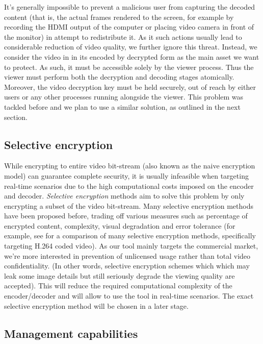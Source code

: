 \documentclass[conference]{IEEEtran}
\begin{document}
It's generally impossible to prevent a malicious user from capturing the
decoded content (that is, the actual frames rendered to the screen, for
example by recording the HDMI output of the computer or placing video
camera in front of the monitor) in attempt to redistribute it. As it
such actions usually lead to considerable reduction of video quality,
we further ignore this threat. Instead, we consider the video in in its
encoded by decrypted form as the main asset we want to protect. As such,
it must be accessible solely by the viewer process. Thus the viewer must
perform both the decryption and decoding stages atomically. Moreover,
the video decryption key must be held securely, out of reach by either
users or any other processes running alongside the viewer. This problem
was tackled before \cite{2} and we plan to use a similar solution, as
outlined in the next section.

\subsection{Selective encryption}

While encrypting to entire video bit-stream (also known as the
naive encryption model) can guarantee complete security, it is
usually infeasible when targeting real-time scenarios due to the high
computational costs imposed on the encoder and decoder. \emph{Selective
encryption} methods aim to solve this problem by only encrypting a
subset of the video bit-stream. Many selective encryption methods have been
proposed before, trading off various measures such as percentage of
encrypted content, complexity, visual degradation and error tolerance
(for example, see \cite{3} for a comparison of many selective
encryption methods, specifically targeting H.264 coded video). As our
tool mainly targets the commercial market, we're more interested in
prevention of unlicensed usage rather than total video confidentiality.
(In other words, selective encryption schemes which which may leak some image details but still 
seriously degrade the viewing quality are accepted). This will reduce the required
computational complexity of the encoder/decoder and will allow to use
the tool in real-time scenarios. The exact selective encryption method
will be chosen in a later stage.

\subsection{Management capabilities}
\end{document}

